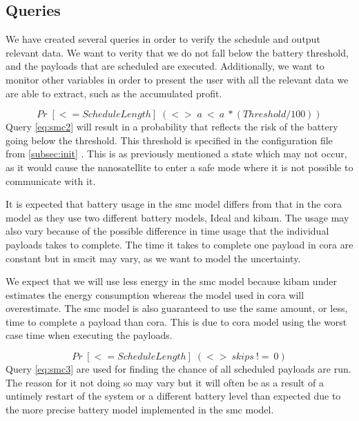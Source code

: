 \subsection{Queries}\label{sec:queries}
We have created several queries in order to verify the schedule and output relevant data. We want to verity that we do not fall below the battery threshold, and the payloads that are scheduled are executed. Additionally, we want to monitor other variables in order to present the user with all the relevant data we are able to extract, such as the accumulated profit.

\begin{equation} \label{eq:smc2}
	Pr\; [<=ScheduleLength] \; (<>\; a\ <\ a\ *(Threshold/100))
\end{equation}
Query \ref{eq:smc2} will result in a probability that reflects the risk of the battery going below the threshold. This threshold is specified in the configuration file from \cref{subsec:init} . This is as previously mentioned a state which may not occur, as it would cause the nanosatellite to enter a safe mode where it is not possible to communicate with it.

It is expected that battery usage in the \gls{smc} model differs from that in the \gls{cora} model as they use two different battery models, Ideal and \gls{kibam}. The usage may also vary because of the possible difference in time usage that the individual payloads takes to complete. The time it takes to complete one payload in \gls{cora} are constant but in \gls{smc}it may vary, as we want to model the uncertainty.

We expect that we will use less energy in the \gls{smc} model because \gls{kibam} under estimates the energy consumption whereas the model used in \gls{cora} will overestimate. The \gls{smc} model is also guaranteed to use the same amount, or less, time to complete a payload than \gls{cora}. This is due to \gls{cora} model using the worst case time when executing the payloads.

\begin{equation} \label{eq:smc3}
	Pr\; [<=ScheduleLength] \; (<> \ skips \ !=\ 0)
\end{equation}
Query \ref{eq:smc3} are used for finding the chance of all scheduled payloads are run. The reason for it not doing so may vary but it will often be as a result of a untimely restart of the system or a different battery level than expected due to the more precise battery model implemented in the \gls{smc} model.

